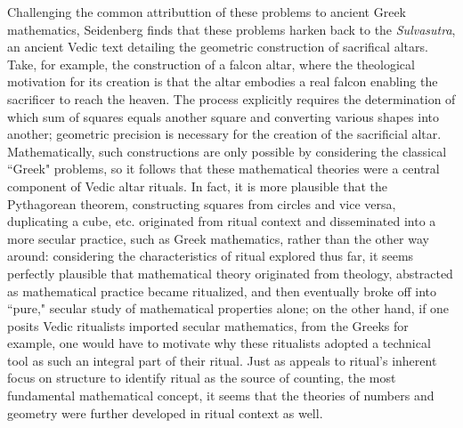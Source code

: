 \documentclass[12pt, letterpaper]{article}
\begin{document}
Challenging the common attributtion of these problems to ancient Greek mathematics, Seidenberg finds that these problems harken back to the \textit{Sulvasutra}, an ancient Vedic text detailing the geometric construction of sacrifical altars. 
Take, for example, the construction of a falcon altar, where the theological motivation for its creation is that the altar embodies a real falcon enabling the sacrificer to reach the heaven. 
The process explicitly requires the determination of which sum of squares equals another square and converting various shapes into another; 
geometric precision is necessary for the creation of the sacrificial altar.
Mathematically, such constructions are only possible by considering the classical ``Greek" problems, so it follows that these mathematical theories were a central component of Vedic altar rituals. 
In fact, it is more plausible that the Pythagorean theorem, constructing squares from circles and vice versa, duplicating a cube, etc. originated from ritual context and disseminated into a more secular practice, such as Greek mathematics, rather than the other way around: 
considering the characteristics of ritual explored thus far, it seems perfectly plausible that mathematical theory originated from theology, abstracted as mathematical practice became ritualized, and then eventually broke off into ``pure," secular study of mathematical properties alone;
on the other hand, if one posits Vedic ritualists imported secular mathematics, from the Greeks for example, one would have to motivate why these ritualists adopted a technical tool as such an integral part of their ritual. 
Just as \cite{seidenberg1962counting} appeals to ritual's inherent focus on structure to identify ritual as the source of counting, the most fundamental mathematical concept, it seems that the theories of numbers and geometry were further developed in ritual context as well. 
\end{document}
